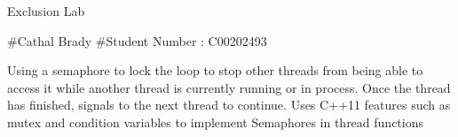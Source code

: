 Exclusion Lab

\#\+Cathal Brady \#\+Student Number \+: C00202493

Using a semaphore to lock the loop to stop other threads from being able to access it while another thread is currently running or in process. Once the thread has finished, signals to the next thread to continue. Uses C++11 features such as mutex and condition variables to implement Semaphores in thread functions 